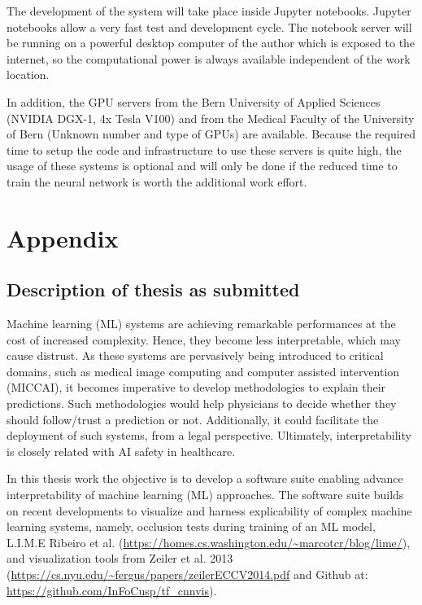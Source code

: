 The development of the system will take place inside Jupyter notebooks. Jupyter notebooks allow a very fast test and development cycle. The notebook server will be running on a powerful desktop computer of the author which is exposed to the internet, so the computational power is always available independent of the work location.

In addition, the GPU servers from the Bern University of Applied Sciences (NVIDIA DGX-1, 4x Tesla V100) and from the Medical Faculty of the University of Bern (Unknown number and type of GPUs) are available. Because the required time to setup the code and infrastructure to use these servers is quite high, the usage of these systems is optional and will only be done if the reduced time to train the neural network is worth the additional work effort.


\section{Appendix}
\subsection{Description of thesis as submitted}

Machine learning (ML) systems are achieving remarkable performances at the cost of increased complexity. Hence, they become less interpretable, which may cause distrust. As these systems are pervasively being introduced to critical domains, such as medical image computing and computer assisted intervention (MICCAI), it becomes imperative to develop methodologies to explain their predictions. Such methodologies would help physicians to decide whether they should follow/trust a prediction or not. Additionally, it could facilitate the deployment of such systems, from a legal perspective. Ultimately, interpretability is closely related with AI safety in healthcare.

In this thesis work the objective is to develop a software suite enabling advance interpretability of machine learning (ML) approaches. The software suite builds on recent developments to visualize and harness explicability of complex machine learning systems, namely, occlusion tests during training of an ML model, L.I.M.E Ribeiro et al. (\url{https://homes.cs.washington.edu/~marcotcr/blog/lime/}), and visualization tools from Zeiler et al. 2013 (\url{https://cs.nyu.edu/~fergus/papers/zeilerECCV2014.pdf} and Github at: \url{https://github.com/InFoCusp/tf\_cnnvis}).
 
